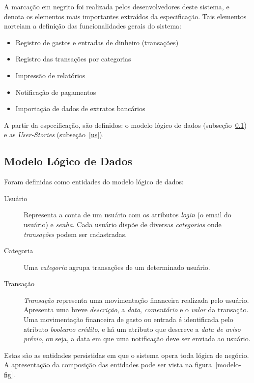 \documentclass[12pt]{article}
\begin{document}
A marcação em negrito foi realizada pelos desenvolvedores deste sistema, e denota os elementos mais importantes extraídos da especificação. Tais elementos norteiam a definição das funcionalidades gerais do sistema:
    
\begin{itemize}
 \item Registro de gastos e entradas de dinheiro (transações)
 \item Registro das transações por categorias
 \item Impressão de relatórios
 \item Notificação de pagamentos
 \item Importação de dados de extratos bancários
\end{itemize}

A partir da especificação, são definidos: o modelo lógico de dados (subseção~\ref{modelo}) e as \textit{User-Stories} (subseção~\ref{us}).

\subsection{Modelo Lógico de Dados}
\label{modelo}

Foram definidas como entidades do modelo lógico de dados:

\begin{description}
 \item [Usuário] Representa a conta de um usuário com os atributos \textit{login} (o email do usuário) e \textit{senha}. Cada usuário dispõe de diversas \textit{categorias} onde \textit{transações} podem ser cadastradas.
 \item [Categoria] Uma \textit{categoria} agrupa transações de um determinado usuário.
 \item [Transação] \textit{Transação} representa uma movimentação financeira realizada pelo usuário. Apresenta uma breve \textit{descrição}, a \textit{data}, \textit{comentário} e o \textit{valor} da transação. Uma movimentação financeira de gasto ou entrada é identificada pelo atributo \textit{booleano} \textit{crédito}, e há um atributo que descreve a \textit{data de aviso prévio}, ou seja, a data em que uma notificação deve ser enviada ao usuário.
\end{description}

Estas são as entidades persistidas em que o sistema opera toda lógica de negócio. A apresentação da composição das entidades pode ser vista na figura~\ref{modelo-fig}.
\end{document}
